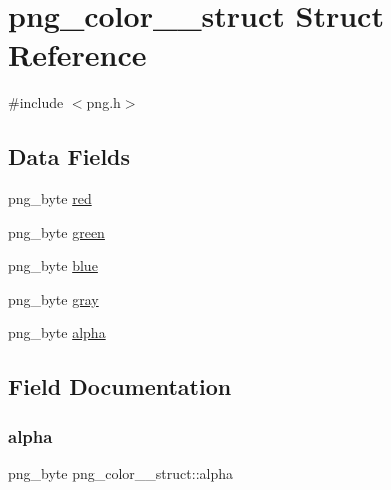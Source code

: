 \hypertarget{structpng__color__8__struct}{}\section{png\+\_\+color\+\_\+\_\+struct Struct Reference}
\label{structpng__color__8__struct}


{\ttfamily \#include $<$png.\+h$>$}

\subsection*{Data Fields}
\begin{DoxyCompactItemize}
\item 
png\+\_\+byte \hyperlink{structpng__color__8__struct_a5cd91bb4b3429256b84e6f28c72778b8}{red}
\item 
png\+\_\+byte \hyperlink{structpng__color__8__struct_a40d053224177df35c037525b39563b05}{green}
\item 
png\+\_\+byte \hyperlink{structpng__color__8__struct_a58225d3b6426185d5a40d3c9935db96a}{blue}
\item 
png\+\_\+byte \hyperlink{structpng__color__8__struct_a574edc173d956cca144927262e88653e}{gray}
\item 
png\+\_\+byte \hyperlink{structpng__color__8__struct_af1c7203aefe12bd35dc9a4cdd58e7a4b}{alpha}
\end{DoxyCompactItemize}


\subsection{Field Documentation}
\mbox{\label{structpng__color__8__struct_af1c7203aefe12bd35dc9a4cdd58e7a4b}} 
\subsubsection{\texorpdfstring{alpha}{alpha}}
{\footnotesize\ttfamily png\+\_\+byte png\+\_\+color\+\_\+\_\+struct\+::alpha}

\mbox{\label{structpng__color__8__struct_a58225d3b6426185d5a40d3c9935db96a}} 
